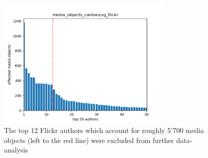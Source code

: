 \begin{figure}[h!]
   \centering
   \includegraphics[width=0.75\textwidth]{img/cantonzug_flickr_top50_w_line}
   \caption{The top 12 Flickr authors which account for roughly 5'700 media objects (left to the red line) were excluded from further data-analysis}
   \label{img:dominant_users_flickr}
\end{figure}

